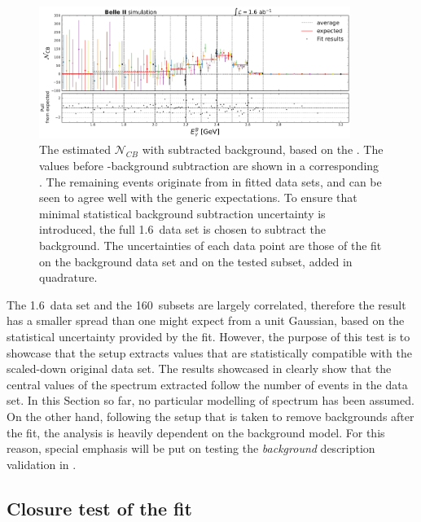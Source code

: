 \begin{figure}[htbp!]
    \includegraphics[width=0.9\textwidth]{figures/mc_validation/subtracted_signal_generic_mc.pdf}
    \caption{\label{fig:subtracted_validation_mc}
    The estimated $\mathcal{N}_{CB}$ with subtracted background, based on the .
    The values before \BB-background subtraction are shown in a corresponding .
    The remaining events originate from \BtoXsgamma in fitted \MC data sets, and can be seen to agree well with the generic \MC expectations.
    To ensure that minimal statistical background subtraction uncertainty is introduced, the full 1.6~\invab data set is chosen to subtract the background.
    The uncertainties of each data point are those of the \Mbc fit on the background data set and on the tested subset, added in quadrature.
    }
\end{figure}

The 1.6~\invab data set and the 160~\invfb subsets are largely correlated, therefore the result has a smaller spread than one might expect from a unit Gaussian, based on the statistical uncertainty provided by the fit.
However, the purpose of this test is to showcase that the setup extracts values that are statistically compatible with the scaled-down original data set.
The results showcased in  clearly show that the central values of the \EB spectrum extracted follow the number of \BtoXsgamma events in the data set.
In this Section so far, no particular modelling of \BtoXsgamma spectrum has been assumed.
On the other hand, following the setup that is taken to remove \BB backgrounds after the \Mbc fit, the analysis is heavily dependent on the background model.
For this reason, special emphasis will be put on testing the \textit{background} description validation in .

\subsection{Closure test of the \texorpdfstring{\Mbc}{Mbc} fit}\label{sec:closure_test}

